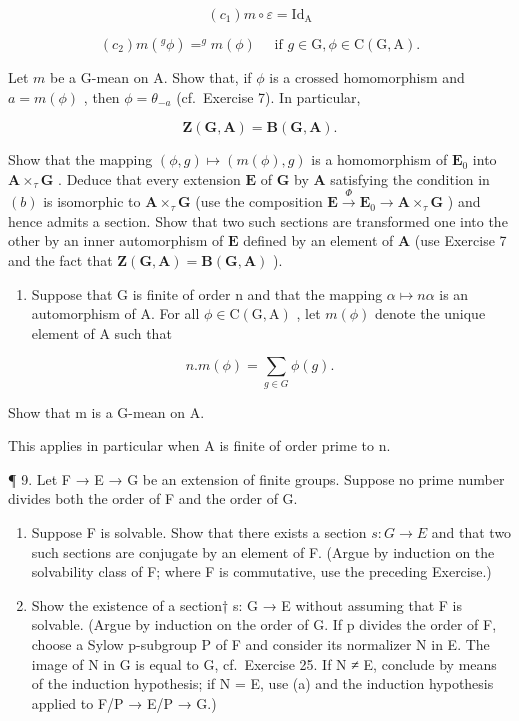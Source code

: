 \[
(c _ {1}) m \circ \varepsilon = \mathrm{Id} _ {\mathrm{A}}
\]

\[
(c _ {2}) m (^ {g} \phi) = ^ {g} m (\phi) \quad \text { if } g \in \mathrm{G}, \phi \in \mathrm{C} (\mathrm{G}, \mathrm{A}).
\]

Let \(m\) be a G-mean on A. Show that, if \(\phi\) is a crossed homomorphism and \(a = m(\phi)\) , then \(\phi = \theta_{-a}\) (cf.~Exercise 7). In particular,

\[
\mathbf {Z} (\mathbf {G}, \mathbf {A}) = \mathbf {B} (\mathbf {G}, \mathbf {A}).
\]

Show that the mapping \((\phi, g) \mapsto (m(\phi), g)\) is a homomorphism of \(\mathbf{E}_0\) into \(\mathbf{A} \times_{\tau} \mathbf{G}\) . Deduce that every extension \(\mathbf{E}\) of \(\mathbf{G}\) by \(\mathbf{A}\) satisfying the condition in \((b)\) is isomorphic to \(\mathbf{A} \times_{\tau} \mathbf{G}\) (use the composition \(\mathbf{E} \xrightarrow{\Phi} \mathbf{E}_0 \to \mathbf{A} \times_{\tau} \mathbf{G}\) ) and hence admits a section. Show that two such sections are transformed one into the other by an inner automorphism of \(\mathbf{E}\) defined by an element of \(\mathbf{A}\) (use Exercise 7 and the fact that \(\mathbf{Z}(\mathbf{G}, \mathbf{A}) = \mathbf{B}(\mathbf{G}, \mathbf{A})\) ).

\begin{enumerate}
\def\labelenumi{(\alph{enumi})}
\setcounter{enumi}{3}
\tightlist
\item
  Suppose that G is finite of order n and that the mapping \(\alpha \mapsto n\alpha\) is an automorphism of A. For all \(\phi \in \mathrm{C}(\mathrm{G}, \mathrm{A})\) , let \(m(\phi)\) denote the unique element of A such that
\end{enumerate}

\[
n. m (\phi) = \sum_ {g \in G} \phi (g).
\]

Show that m is a G-mean on A.

This applies in particular when A is finite of order prime to n.

¶ 9. Let F → E → G be an extension of finite groups. Suppose no prime number divides both the order of F and the order of G.

\begin{enumerate}
\def\labelenumi{(\alph{enumi})}
\item
  Suppose F is solvable. Show that there exists a section \(s: G \rightarrow E\) and that two such sections are conjugate by an element of F. (Argue by induction on the solvability class of F; where F is commutative, use the preceding Exercise.)
\item
  Show the existence of a section† s: G → E without assuming that F is solvable. (Argue by induction on the order of G. If p divides the order of F, choose a Sylow p-subgroup P of F and consider its normalizer N in E. The image of N in G is equal to G, cf.~Exercise 25. If N ≠ E, conclude by means of the induction hypothesis; if N = E, use (a) and the induction hypothesis applied to F/P → E/P → G.)
\end{enumerate}

